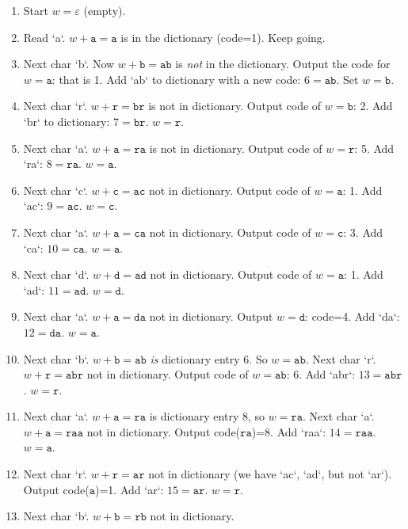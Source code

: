 \documentclass{article}
\begin{document}
\begin{enumerate}
\item Start $w=\varepsilon$ (empty).
\item Read `a`. $w+\texttt{a}=\texttt{a}$ is in the dictionary (code=1). Keep going.
\item Next char `b`. Now $w+\texttt{b}=\texttt{ab}$ is \emph{not} in the dictionary.  
  Output the code for $w=\texttt{a}$: that is 1.  
  Add `ab` to dictionary with a new code: $6=\texttt{ab}$.  
  Set $w=\texttt{b}$.
\item Next char `r`. $w+\texttt{r}=\texttt{br}$ is not in dictionary.  
  Output code of $w=\texttt{b}$: 2.  
  Add `br` to dictionary: $7=\texttt{br}$.  
  $w=\texttt{r}$.
\item Next char `a`. $w+\texttt{a}=\texttt{ra}$ is not in dictionary.  
  Output code of $w=\texttt{r}$: 5.  
  Add `ra`: $8=\texttt{ra}$.  
  $w=\texttt{a}$.
\item Next char `c`. $w+\texttt{c}=\texttt{ac}$ not in dictionary.  
  Output code of $w=\texttt{a}$: 1.  
  Add `ac`: $9=\texttt{ac}$.  
  $w=\texttt{c}$.
\item Next char `a`. $w+\texttt{a}=\texttt{ca}$ not in dictionary.  
  Output code of $w=\texttt{c}$: 3.  
  Add `ca`: $10=\texttt{ca}$.  
  $w=\texttt{a}$.
\item Next char `d`. $w+\texttt{d}=\texttt{ad}$ not in dictionary.  
  Output code of $w=\texttt{a}$: 1.  
  Add `ad`: $11=\texttt{ad}$.  
  $w=\texttt{d}$.
\item Next char `a`. $w+\texttt{a}=\texttt{da}$ not in dictionary.  
  Output $w=\texttt{d}$: code=4.  
  Add `da`: $12=\texttt{da}$.  
  $w=\texttt{a}$.
\item Next char `b`. $w+\texttt{b}=\texttt{ab}$ \textit{is} dictionary entry 6. So $w=\texttt{ab}$.  
  Next char `r`. $w+\texttt{r}=\texttt{abr}$ not in dictionary.  
  Output code of $w=\texttt{ab}$: 6.  
  Add `abr`: $13=\texttt{abr}$.  
  $w=\texttt{r}$.
\item Next char `a`. $w+\texttt{a}=\texttt{ra}$ is dictionary entry 8, so $w=\texttt{ra}$.  
  Next char `a`. $w+\texttt{a}=\texttt{raa}$ not in dictionary.  
  Output code($\texttt{ra}$)=8.  
  Add `raa`: $14=\texttt{raa}$.  
  $w=\texttt{a}$.
\item Next char `r`. $w+\texttt{r}=\texttt{ar}$ not in dictionary (we have `ac`, `ad`, but not `ar`).  
  Output code($\texttt{a}$)=1.  
  Add `ar`: $15=\texttt{ar}$.  
  $w=\texttt{r}$.
\item Next char `b`. $w+\texttt{b}=\texttt{rb}$ not in dictionary.  

\end{enumerate}
\end{document}
